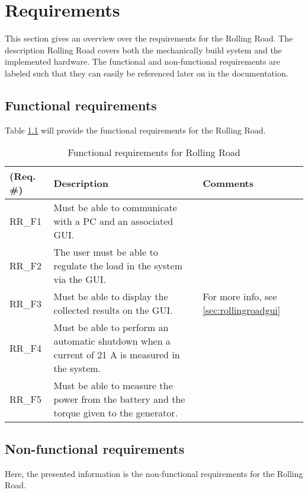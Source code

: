\chapter{Requirements}
This section gives an overview over the requirements for the Rolling Road. The description Rolling Road covers both the mechanically build system and the implemented hardware. The functional and non-functional requirements are labeled such that they can easily be referenced later on in the documentation.

\section{Functional requirements}
Table \ref{Functional:Rolling Road} will provide the functional requirements for the Rolling Road.

\begin{table}[h!]
	\centering
	\begin{tabular}{|p{2 cm}|p{7 cm}|p{4 cm}|}
	\hline
	\textbf{(Req. \#)} & \textbf{Description} & \textbf{Comments} \\\hline
	RR\_F1	& Must be able to communicate with a PC and an associated GUI. &   \\\hline
	RR\_F2	& The user must be able to regulate the load in the system via the GUI. &   \\\hline
	RR\_F3	& Must be able to display the collected results on the GUI. & For more info, see \ref{sec:rollingroadgui}  \\\hline
	RR\_F4	& Must be able to perform an automatic shutdown when a current of 21 A is measured in the system. &   \\\hline
	RR\_F5	& Must be able to measure the power from the battery and the torque given to the generator. &   \\\hline
	\end{tabular}
	\label{Functional:Rolling Road}
	\caption{Functional requirements for Rolling Road}
\end{table}

\section{Non-functional requirements}
Here, the presented information is the non-functional requirements for the Rolling Road.

